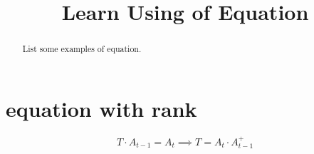 \documentclass[a4paper]{article}
\begin{document}
    \title{Learn Using of Equation}
    \maketitle
    
    \begin{abstract}
        \vspace{20pt}
        {\large List some examples of equation.}
    \end{abstract}

    \section{equation with rank}
    \begin{equation}
        T \cdot A_{t-1}=A_t \implies T=A_t \cdot A_{t-1}^{+}
        \label{eq_pagerank}
    \end{equation}

        
    
\end{document}
